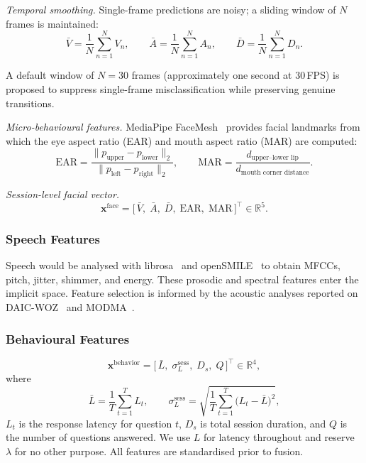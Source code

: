 \documentclass[12pt]{article}
\begin{document}
\emph{Temporal smoothing.} Single-frame predictions are noisy; a sliding
window of $N$ frames is maintained:
\begin{equation}
\bar{V} = \frac{1}{N}\sum_{n=1}^{N}V_n, \qquad
\bar{A} = \frac{1}{N}\sum_{n=1}^{N}A_n, \qquad
\bar{D} = \frac{1}{N}\sum_{n=1}^{N}D_n .
\end{equation}

\noindent A default window of $N=30$ frames (approximately one second at
30\,FPS) is proposed to suppress single-frame misclassification while
preserving genuine transitions.

\emph{Micro-behavioural features.} MediaPipe
FaceMesh~\cite{lugaresi2019mediapipe} provides facial landmarks from
which the eye aspect ratio (EAR) and mouth aspect ratio (MAR) are
computed:
\begin{equation}
\text{EAR} = \frac{\lVert p_{\text{upper}} - p_{\text{lower}}\rVert_{2}}
                 {\lVert p_{\text{left}} - p_{\text{right}}\rVert_{2}},
\qquad
\text{MAR} = \frac{d_{\text{upper--lower lip}}}
                  {d_{\text{mouth corner distance}}} .
\end{equation}

\emph{Session-level facial vector.}
\begin{equation}
\mathbf{x}^{\text{face}} = \bigl[\,\bar{V},\; \bar{A},\; \bar{D},\;
\text{EAR},\; \text{MAR}\,\bigr]^{\top} \in \mathbb{R}^{5}.
\end{equation}

\subsubsection{Speech Features}

Speech would be analysed with librosa~\cite{mcfee2015librosa} and
openSMILE~\cite{eyben2010opensmile} to obtain MFCCs, pitch, jitter,
shimmer, and energy. These prosodic and spectral features enter the
implicit space. Feature selection is informed by the acoustic analyses
reported on DAIC-WOZ~\cite{gratch2014daic,alhanai2018daic} and
MODMA~\cite{liu2022modma}.

\subsubsection{Behavioural Features}

\begin{equation}
\mathbf{x}^{\text{behavior}}
= \bigl[\,\bar{L},\; \sigma^{\text{sess}}_{L},\; D_{s},\; Q\,\bigr]^{\top}
\in \mathbb{R}^{4},
\end{equation}
where
\begin{equation}
\bar{L} = \frac{1}{T}\sum_{t=1}^{T}L_t,
\qquad
\sigma^{\text{sess}}_{L}
= \sqrt{\frac{1}{T}\sum_{t=1}^{T}\bigl(L_t - \bar{L}\bigr)^{2}} ,
\end{equation}
$L_t$ is the response latency for question $t$,
$D_{s}$ is total session duration, and $Q$ is the number of questions
answered. We use $L$ for latency throughout and reserve $\lambda$ for
no other purpose. All features are standardised prior to fusion.
\end{document}
